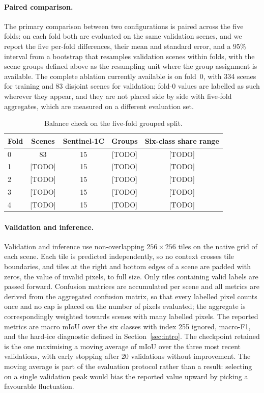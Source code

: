 \documentclass[preprint,12pt,authoryear]{elsarticle}
\begin{document}
\paragraph{Paired comparison.} The primary comparison between two
configurations is paired across the five folds: on each fold both are evaluated
on the same validation scenes, and we report the five per-fold differences,
their mean and standard error, and a 95\% interval from a bootstrap that
resamples validation scenes within folds, with the scene groups defined above as
the resampling unit where the group assignment is available. The complete
ablation currently available is on fold~0, with 334 scenes for training and 83
disjoint scenes for validation; fold-0 values are labelled as such wherever they
appear, and they are not placed side by side with five-fold aggregates, which
are measured on a different evaluation set.

\begin{table}[t]
\centering
\caption{Balance check on the five-fold grouped split.}
\label{tab:folds}
\begin{tabular}{lcccc}
\toprule
Fold & Scenes & Sentinel-1C & Groups & Six-class share range \\
\midrule
0 & 83 & 15 & [TODO] & [TODO] \\
1 & [TODO] & 15 & [TODO] & [TODO] \\
2 & [TODO] & 15 & [TODO] & [TODO] \\
3 & [TODO] & 15 & [TODO] & [TODO] \\
4 & [TODO] & 15 & [TODO] & [TODO] \\
\bottomrule
\end{tabular}
\end{table}

\paragraph{Validation and inference.} Validation and inference use
non-overlapping $256\times256$ tiles on the native grid of each scene. Each tile
is predicted independently, so no context crosses tile boundaries, and tiles at
the right and bottom edges of a scene are padded with zeros, the value of
invalid pixels, to full size. Only tiles containing valid labels are passed
forward. Confusion matrices are accumulated per scene and all metrics are
derived from the aggregated confusion matrix, so that every labelled pixel
counts once and no cap is placed on the number of pixels evaluated; the
aggregate is correspondingly weighted towards scenes with many labelled
pixels. The reported
metrics are macro mIoU over the six classes with index 255 ignored, macro-F1,
and the hard-ice diagnostic defined in Section~\ref{sec:intro}. The checkpoint
retained is the one maximising a moving average of mIoU over the three most
recent validations, with early stopping after 20 validations without
improvement. The moving average is part of the evaluation protocol rather than a
result: selecting on a single validation peak would bias the reported value
upward by picking a favourable fluctuation.
\end{document}
